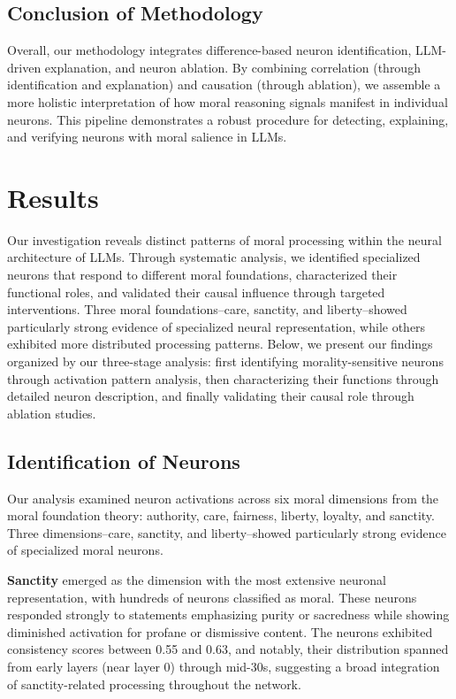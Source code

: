 \documentclass[runninghheads]{llncs}
\begin{document}
\subsection{Conclusion of Methodology}

Overall, our methodology integrates difference-based neuron identification, LLM-driven explanation, and neuron ablation. By combining correlation (through identification and explanation) and causation (through ablation), we assemble a more holistic interpretation of how moral reasoning signals manifest in individual neurons. This pipeline demonstrates a robust procedure for detecting, explaining, and verifying neurons with moral salience in LLMs.












\section{Results}
\label{results}

Our investigation reveals distinct patterns of moral processing within the neural architecture of LLMs. Through systematic analysis, we identified specialized neurons that respond to different moral foundations, characterized their functional roles, and validated their causal influence through targeted interventions. Three moral foundations--care, sanctity, and liberty--showed particularly strong evidence of specialized neural representation, while others exhibited more distributed processing patterns. Below, we present our findings organized by our three-stage analysis: first identifying morality-sensitive neurons through activation pattern analysis, then characterizing their functions through detailed neuron description, and finally validating their causal role through ablation studies.


\subsection{Identification of Neurons}

Our analysis examined neuron activations across six moral dimensions from the moral foundation theory: authority, care, fairness, liberty, loyalty, and sanctity. Three dimensions--care, sanctity, and liberty--showed particularly strong evidence of specialized moral neurons.

\textbf{Sanctity} emerged as the dimension with the most extensive neuronal representation, with hundreds of neurons classified as moral. These neurons responded strongly to statements emphasizing purity or sacredness while showing diminished activation for profane or dismissive content. The neurons exhibited consistency scores between 0.55 and 0.63, and notably, their distribution spanned from early layers (near layer 0) through mid-30s, suggesting a broad integration of sanctity-related processing throughout the network.
\end{document}
